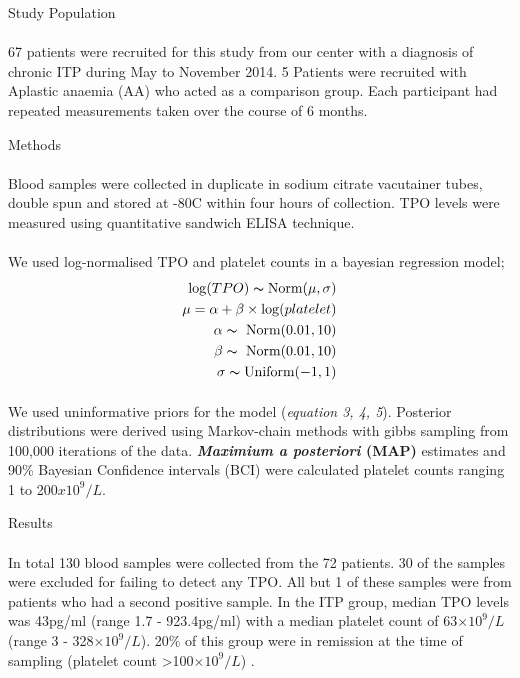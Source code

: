 \documentclass[landscape,a0paper,fontscale=0.285]{beamer} %
\newlength{\onecolwid}
\begin{document}
\begin{frame}[t]
\begin{columns}[t]
\begin{column}{\onecolwid}
\begin{block}{Study Population}
\paragraph{} 67 patients were recruited for this study from our center with a diagnosis of chronic ITP during May to November 2014. 5 Patients were recruited with Aplastic anaemia (AA) who acted as a comparison group. Each participant had repeated measurements taken over the course of 6 months.  



\end{block}

\begin{block}{Methods}
\paragraph{}Blood samples were collected in duplicate in sodium citrate vacutainer tubes, double spun and stored at -80\textdegree C within four hours of collection. TPO levels were measured using quantitative sandwich ELISA technique.
\paragraph{} We used log-normalised TPO and platelet counts in a bayesian regression model;
\begin{align}
    \log(TPO) \thicksim \text{Norm}(\mu, \sigma) \\
    \mu = \alpha + \beta\times \log(platelet) \\
    \alpha \thicksim\ \text{Norm}(0.01, 10) \\
    \beta \thicksim\ \text{Norm}(0.01, 10) \\
    \sigma \thicksim \text{Uniform}(-1, 1)
\end{align}
\paragraph{} We used uninformative priors for the model (\textit{equation 3, 4, 5}). Posterior distributions were derived using Markov-chain methods with gibbs sampling from 100,000 iterations of the data. \textbf{\textit{Maximium a posteriori} (MAP)} estimates and 90\% Bayesian Confidence intervals (BCI) were calculated platelet counts ranging 1 to 200$x10^9/L$. 
\end{block}

\begin{block}{Results}
\paragraph{} In total 130 blood samples were collected from the 72 patients. 30 of the samples were excluded for failing to detect any TPO. All but 1 of these samples were from patients who had a second positive sample. In the ITP group, median TPO levels was 43pg/ml (range 1.7 - 923.4pg/ml) with a median platelet count of 63$\times 10^9/L$ (range 3 - 328$\times 10^9/L$). 20\% of this group were in remission at the time of sampling (platelet count >100$\times 10^9/L$) .
\end{block}


\end{column}
\end{columns}
\end{frame}
\end{document}

